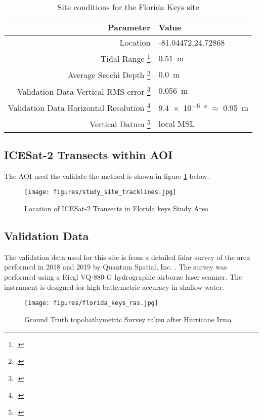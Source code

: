 \begin{table}[h]
    \begin{minipage}{0.5\textwidth}
        \centering\begin{tabular}{r l }
            Parameter                                                      & \textbf{Value}                                 \\
            \hline
            Location                                                       & -81.04472,24.72868                             \\
            Tidal Range \footcite{Tidal_data_reanalysis2022}               & \qty{0.51}{m}                                  \\
            Average Secchi Depth \footcite{ACRI-STGlobColourTeam2020}      & \qty{0.0}{m}                                   \\
            Validation Data Vertical RMS error \footcite{Keys2019Lidar}    & \qty{0.056}{m}                                 \\
            Validation Data Horizontal Resolution \footcite{Keys2019Lidar} & \qty{9.4e-6}{ \degree} $\approx$ \qty{0.95}{m} \\
            Vertical Datum \footcite{Keys2019Lidar}                        & local MSL                                      \\
        \end{tabular}
    \end{minipage}
    \caption{Site conditions for the Florida Keys site}
    \label{table:floridasitestats}
\end{table}


\subsection{ICESat-2 Transects within AOI}
The AOI used the validate the method is shown in figure \ref{fig:keys_transects} below.
\begin{figure}[h]
    \centering
    \texttt{[image: figures/study\_site\_tracklines.jpg]}
    \caption{Location of ICESat-2 Transects in Florida keys Study Area}
    \label{fig:keys_transects}
\end{figure}
\subsection{Validation Data}
The validation data used for this site is from a detailed lidar survey of the area performed in 2018 and 2019 by Quantum Spatial, Inc. \parencite{Keys2019Lidar}. The survey was performed using a Riegl VQ-880-G hydrographic airborne laser scanner. The instrument is designed for high bathymetric accuracy in shallow water.
\begin{figure}[h]
    \centering
    \texttt{[image: figures/florida\_keys\_ras.jpg]}
    \caption{Ground Truth topobathymetric Survey taken after Hurricane Irma}
    \label{fig:truebathy}
\end{figure}
